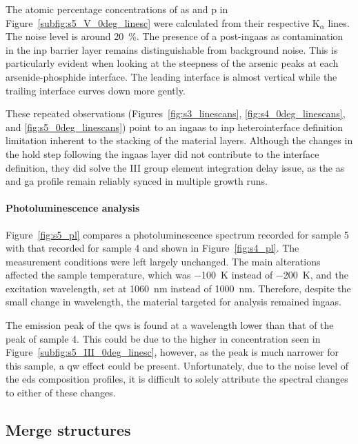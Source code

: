The atomic percentage concentrations of \acl{as} and \acl{p} in Figure~\ref{subfig:s5_V_0deg_linesc} were calculated from their respective K\(_\alpha\) lines. The noise level is around \qty{20}{\%}. The presence of a post-\acs{ingaas} \acl{as} contamination in the \acs{inp} barrier layer remains distinguishable from background noise. This is particularly evident when looking at the steepness of the arsenic peaks at each arsenide-phosphide interface. The leading interface is almost vertical while the trailing interface curves down more gently.

These repeated observations (Figures~\ref{fig:s3_linescans}, \ref{fig:s4_0deg_linescans}, and \ref{fig:s5_0deg_linescans}) point to an \acs{ingaas} to \acs{inp} heterointerface definition limitation inherent to the stacking of the material layers. Although the changes in the hold step following the \acs{ingaas} layer did not contribute to the interface definition, they did solve the III group element integration delay issue, as the \acl{as} and \acl{ga} profile remain reliably synced in multiple growth runs.
\par

\paragraph{Photoluminescence analysis} Figure~\ref{fig:s5_pl} compares a photoluminescence spectrum recorded for sample 5 with that recorded for sample 4 and shown in Figure~\ref{fig:s4_pl}. The measurement conditions were left largely unchanged. The main alterations affected the sample temperature, which was \qty{-100}{\kelvin} instead of \qty{-200}{\kelvin}, and the excitation wavelength, set at \qty{1060}{\nano\metre} instead of \qty{1000}{\nano\metre}. Therefore, despite the small change in wavelength, the material targeted for analysis remained \acs{ingaas}.

The emission peak of the \acl{qw}s is found at a wavelength lower than that of the peak of sample 4. This could be due to the higher \acl{in} concentration seen in Figure~\ref{subfig:s5_III_0deg_linesc}, however, as the peak is much narrower for this sample, a \acl{qw} effect could be present. Unfortunately, due to the noise level of the \acs{eds} composition profiles, it is difficult to solely attribute the spectral changes to either of these changes.
\par

\subsection{Merge structures}
\label{sec:merge}

